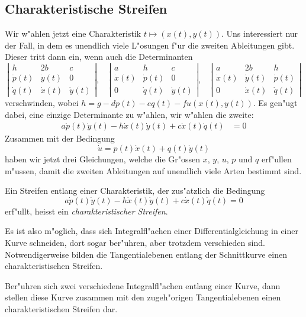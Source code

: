 \subsection{Charakteristische Streifen}
Wir w"ahlen jetzt eine Charakteristik $t\mapsto(x(t),y(t))$.
Uns interessiert nur der Fall, in dem es unendlich viele
L"osungen f"ur die zweiten Ableitungen gibt. Dieser tritt dann
ein, wenn auch die Determinanten
\[
\left|
\begin{matrix}
h&2b&c\\
\dot p(t)&\dot y(t)&0\\
\dot q(t)&\dot x(t)&\dot y(t)
\end{matrix}
\right|
,
\quad
\left|
\begin{matrix}
a&h&c\\
\dot x(t)&\dot p(t)&0\\
0&\dot q(t)&\dot y(t)
\end{matrix}
\right|
,
\quad
\left|
\begin{matrix}
a&2b&h\\
\dot x(t)&\dot y(t)&\dot p(t)\\
0&\dot x(t)&\dot q(t)
\end{matrix}
\right|
\]
verschwinden, wobei $h=g-dp(t)-eq(t)-fu(x(t),y(t))$.
Es gen"ugt dabei, eine einzige Determinante zu w"ahlen,
wir w"ahlen die zweite:
\begin{align*}
a\dot p(t)\dot y(t)-h\dot x(t)\dot y(t)+c\dot x(t)\dot q(t)&=0
\end{align*}
Zusammen mit der Bedingung
\[
\dot u=p(t)\dot x(t)+q(t)\dot y(t)
\]
haben wir jetzt drei Gleichungen, welche die Gr"ossen 
$x$, $y$, $u$, $p$ und $q$ erf"ullen m"ussen, damit die zweiten
Ableitungen auf unendlich viele Arten bestimmt sind.

\begin{definition}
Ein Streifen entlang einer Charakteristik, der zus"atzlich die
Bedingung 
\[
a\dot p(t)\dot y(t)-h\dot x(t)\dot y(t)+c\dot x(t)\dot q(t)=0
\]
erf"ullt, heisst ein {\em charakteristischer Streifen}.
\end{definition}

Es ist also m"oglich, dass sich Integralfl"achen einer Differentialgleichung
in einer Kurve schneiden, dort sogar ber"uhren, aber trotzdem verschieden
sind. Notwendigerweise bilden die Tangentialebenen
entlang der Schnittkurve einen charakteristischen Streifen.

\begin{satz}Ber"uhren sich zwei verschiedene Integralfl"achen entlang einer
Kurve, dann stellen diese Kurve zusammen mit den zugeh"origen Tangentialebenen
einen charakteristischen Streifen dar.
\end{satz}


